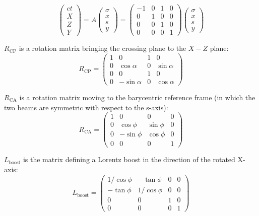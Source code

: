 \begin{equation}
\left( \begin{matrix}
ct\\
X\\
Z\\
Y
\end{matrix} \right) = A
\left( \begin{matrix}
\sigma\\
x\\
s\\
y
\end{matrix} \right) =
\left( \begin{matrix}
-1 &0 &1&0\\
0 &1 &0&0\\
0 &0 &1&0\\
0 &0 &0&1
\end{matrix} \right) 
\left( \begin{matrix}
\sigma\\
x\\
s\\
y
\end{matrix} \right)
\end{equation}

$R_{\mathrm{CP}}$ is a rotation matrix bringing the crossing plane to the $X-Z$ plane:
\begin{equation}
R_{\mathrm{CP}}=
\left( \begin{matrix}
1 &0 &1&0\\
0 &\cos\alpha &0&\sin\alpha\\
0 &0 &1&0\\
0 &-\sin\alpha &0&\cos\alpha
\end{matrix} \right) 
\end{equation}

$R_{\mathrm{CA}}$ is a rotation matrix moving to the barycentric reference frame (in which the two beams are symmetric with respect to the s-axis):
\begin{equation}
R_{\mathrm{CA}}=
\left( \begin{matrix}
1 &0 &0&0\\
0 &\cos\phi&\sin\phi &0\\
0 &-\sin\phi&\cos\phi &0\\
0 &0 &0&1
\end{matrix} \right) 
\end{equation}

$L_{\mathrm{boost}}$ is the matrix defining a Lorentz boost in the direction of the rotated X-axis:
\begin{equation}
L_{\mathrm{boost}}=
\left( \begin{matrix}
1/\cos\phi &-\tan\phi &0&0\\
-\tan\phi &1/\cos\phi&0 &0\\
0 &0&1 &0\\
0 &0 &0&1
\end{matrix} \right) 
\end{equation}

